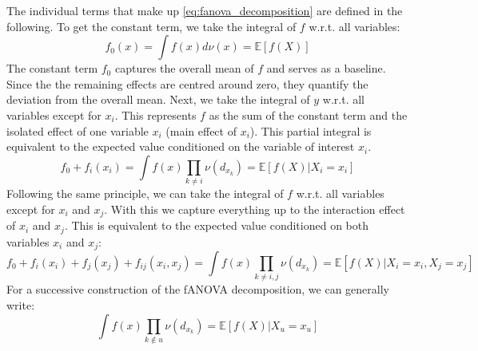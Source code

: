 
The individual terms that make up \autoref{eq:fanova_decomposition} are defined in the following.
To get the constant term, we take the integral of $f$ w.r.t. all variables:
\begin{equation}
    f_{0}(x) = \int f(x) d\nu(x) = \mathbb{E}[f(X)]
    \label{eq:intercapt}
\end{equation}
The constant term $f_0$ captures the overall mean of $f$ and serves as a baseline. Since the the remaining effects are centred around zero, they quantify the deviation from the overall mean.  Next, we take the integral of $y$ w.r.t. all variables except for $x_i$. This represents $f$ as the sum of the constant term and the isolated effect of one variable $x_i$ (main effect of $x_i$). This partial integral is equivalent to the expected value conditioned on the variable of interest $x_i$.
\begin{equation}
    f_0 + f_i(x_i) = \int f(x) \prod_{k \neq i} \nu (d_{x_{k}}) = \mathbb{E}[f(X) | X_i = x_i]
    \label{eq:main_effect}
\end{equation}
Following the same principle, we can take the integral of $f$ w.r.t. all variables except for $x_i$ and $x_j$. With this we capture everything up to the interaction effect of $x_i$ and $x_j$. This is equivalent to the expected value conditioned on both variables $x_i$ and $x_j$:
\begin{equation}
    f_0 + f_i(x_i) + f_j(x_j) + f_{ij}(x_i,x_j) = \int f(x) \prod_{k \neq i,j} \nu(d_{x_{k}}) = \mathbb{E}[f(X) | X_i = x_i, X_j = x_j]
    \label{eq:interaction_effects}
\end{equation}
For a successive construction of the fANOVA decomposition, we can generally write:
\begin{equation}
    \int f(x) \prod_{k \notin u} \nu(d_{x_{k}}) = \mathbb{E}[f(X) | X_u = x_u]
    \label{eq:fanova_component}
\end{equation}
